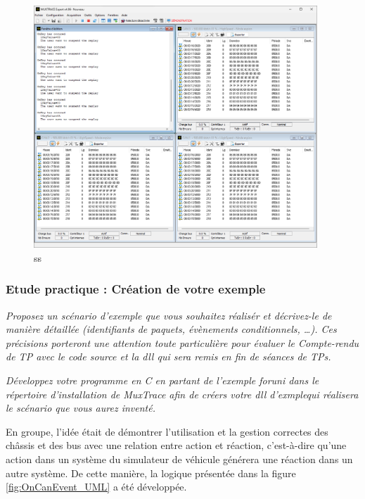 \documentclass{rapportECC}
\begin{document}
\begin{figure}[H]
    \centering
    \includegraphics[width=0.95\textwidth]{./images/MuxTrace_dll_running_default_example_number_1_res_indus_31_01_2024_ubs_lorient_M1SESI.png}
    \caption{ss}
    \label{fig:MuxTrace_dll_default}
\end{figure}


\subsubsection*{Etude practique : Création de votre exemple}

\textit{Proposez un scénario d'exemple que vous souhaitez réalisér et décrivez-le de manière détaillée (identifiants de paquets, évènements conditionnels, \dots). Ces précisions porteront une attention toute particulière pour évaluer le Compte-rendu de TP avec le code source et la dll qui sera remis en fin de séances de TPs.}

\textit{Développez votre programme en C en partant de l'exemple foruni dans le répertoire d'installation de MuxTrace afin de créers votre dll d'exmplequi réalisera le scénario que vous aurez inventé.}

En groupe, l'idée était de démontrer l'utilisation et la gestion correctes des châssis et des bus avec une relation entre action et réaction, c'est-à-dire qu'une action dans un système du simulateur de véhicule générera une réaction dans un autre système. De cette manière, la logique présentée dans la figure \ref{fig:OnCanEvent_UML} a été développée.
\end{document}
